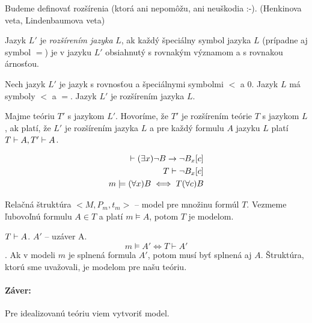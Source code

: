 Budeme definovať rozšírenia (ktorá ani nepomôžu, ani neuškodia :-). (Henkinova
veta, Lindenbaumova veta)

\begin{definicia}
    Jazyk $L'$ je \emph{rozšírením jazyka} $L$, ak každý
    špeciálny symbol jazyka $L$ (prípadne aj symbol $=$)
    je v jazyku $L'$ obsiahnutý s rovnakým významom a s rovnakou árnosťou.
\end{definicia}

\begin{priklad}
    Nech jazyk $L'$ je jazyk s rovnosťou a špeciálnymi symbolmi $<$ a $0$.
    Jazyk $L$ má symboly $<$ a $=$. Jazyk $L'$ je rozšírením jazyka $L$.
\end{priklad}    

\begin{definicia}
    Majme teóriu $T'$ s jazykom $L'$. Hovoríme, že $T'$ je
    rozšírením teórie $T$ s jazykom $L$, ak platí,
    že $L'$ je rozšírením jazyka $L$ a pre každý formulu $A$ jazyku $L$
    platí $T \vdash A, T' \vdash A$. 
\end{definicia}


\begin{veta}[Henkinova]

    \begin{eqnarray*}
        \vdash (\exists x) \neg B \rightarrow \neg B_x[c] \\
        T \vdash  \neg B_x[c] \\
        m \models  (\forall x) B \iff T (\forall c) B \\
    \end{eqnarray*}
\end{veta}


\par Relačná štruktúra $<M, P_m, t_m>$ -- model pre množinu formúl $T$. Vezmeme
ľubovoľnú formulu $A \in T$ a platí $m \models A$, potom $T$ je modelom.

\par $T \vdash A$. $A'$ -- uzáver A. $$ m \models A' \iff T \vdash A'$$. Ak v
modeli $m$ je splnená formula $A'$, potom musí byť splnená aj $A$. Štruktúra,
ktorú sme uvažovali, je modelom pre našu teóriu.

\paragraph{Záver:} Pre idealizovanú teóriu viem vytvoriť model.

